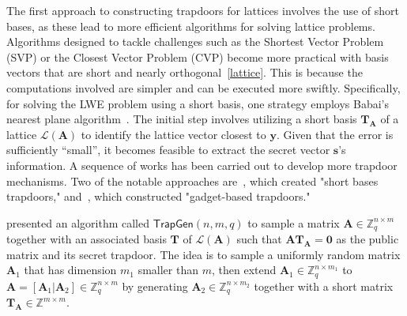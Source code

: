 \documentclass[cryptography,review,submit,pdftex,moreauthors,amsmath,amssymb,aps,strict]{Definitions/mdpi}
\begin{document}
The first approach to constructing trapdoors for lattices involves the use of short bases, as these lead to more efficient algorithms for solving lattice problems. Algorithms designed to tackle challenges such as the Shortest Vector Problem (SVP) or the Closest Vector Problem (CVP) become more practical with basis vectors that are short and nearly orthogonal~\ref{lattice}. This is because the computations involved are simpler and can be executed more swiftly. Specifically, for solving the LWE problem using a short basis, one strategy employs Babai's nearest plane algorithm~\cite{Babai}. The initial step involves utilizing a short basis $\mathbf{T}_{\mathbf{A}}$ of a lattice $\mathcal{L}(\mathbf{A})$ to identify the lattice vector closest to $\mathbf{y}$. Given that the error is sufficiently ``small'', it becomes feasible to extract the secret vector $\mathbf{s}$'s information. A sequence of works has been carried out to develop more trapdoor mechanisms. Two of the notable approaches are~\cite{AP09}, which created "short bases trapdoors," and~\cite{MP12}, which constructed "gadget-based trapdoors."

\cite{AP09} presented an algorithm called $\mathsf{TrapGen}(n,m,q)$ to sample a matrix $\mathbf{A}\in\mathbb{Z}_q^{n\times m}$ together with an associated basis $\mathbf{T}$ of $\mathcal{L}({\mathbf{A}})$ such that $\mathbf{A}\mathbf{T}_{\mathbf{A}} = \mathbf{0}$ as the public matrix and its secret trapdoor. The idea is to sample a uniformly random matrix $\mathbf{A}_1$ that has dimension $m_1$ smaller than $m$, then extend $\mathbf{A}_1\in\mathbb{Z}^{n\times m_1}_q$ to $\mathbf{A}=[\mathbf{A}_1|\mathbf{A}_2]\in\mathbb{Z}^{n\times m}_q$ by generating $\mathbf{A}_2\in\mathbb{Z}^{n\times m_2}_q$ together with a short matrix $\mathbf{T}_{\mathbf{A}}\in\mathbb{Z}^{m\times m}$.
\end{document}
